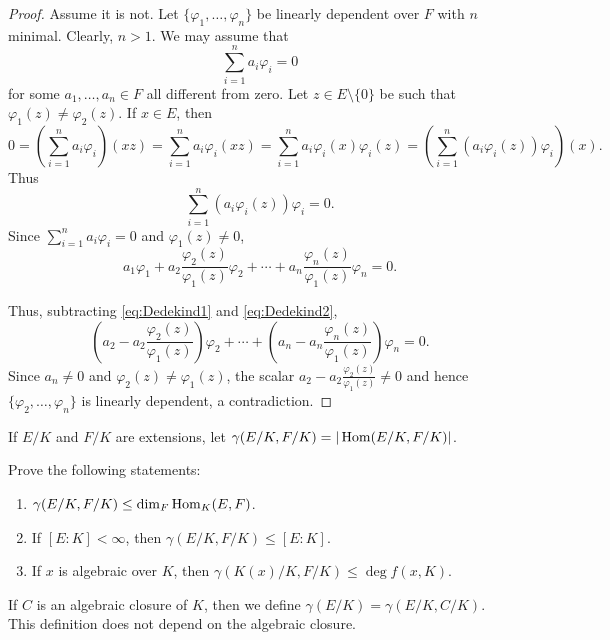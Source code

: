 \begin{proof}
    Assume it is not. Let $\{\varphi_1,\dots,\varphi_n\}$ 
    be linearly dependent over $F$ with $n$ minimal. Clearly, $n>1$. 
    We may assume that 
    \begin{equation}
        \label{eq:Dedekind1}
        \sum_{i=1}^n a_i\varphi_i=0
    \end{equation}
    for some $a_1,\dots,a_n\in F$ all different from zero. 
    Let
    $z\in E\setminus\{0\}$ be such that $\varphi_1(z)\ne\varphi_2(z)$. If $x\in E$, then
    \[
    0=\left(\sum_{i=1}^na_i\varphi_i\right)(xz)=\sum_{i=1}^na_i\varphi_i(xz)
    =\sum_{i=1}^na_i\varphi_i(x)\varphi_i(z)
    =\left(\sum_{i=1}^n (a_i\varphi_i(z))\varphi_i\right)(x).
    \]
    Thus 
    \[
        \sum_{i=1}^n (a_i\varphi_i(z))\varphi_i=0.
    \]
    Since $\sum_{i=1}^na_i\varphi_i=0$ and $\varphi_1(z)\ne0$, 
    \begin{equation}
    \label{eq:Dedekind2}
        a_1\varphi_1+a_2\frac{\varphi_2(z)}{\varphi_1(z)}\varphi_2+\cdots+a_n\frac{\varphi_n(z)}{\varphi_1(z)}\varphi_n=0.
    \end{equation}

    Thus, 
    subtracting \eqref{eq:Dedekind1} and \eqref{eq:Dedekind2}, 
    \[
    \left(a_2-a_2\frac{\varphi_2(z)}{\varphi_1(z)}\right)\varphi_2
    +\cdots+\left(a_n-a_n\frac{\varphi_n(z)}{\varphi_1(z)}\right)\varphi_n=0.
    \]
    Since $a_n\ne 0$ and $\varphi_2(z)\ne\varphi_1(z)$, 
    the scalar $a_2-a_2\frac{\varphi_2(z)}{\varphi_1(z)}\ne 0$ and hence 
    $\{\varphi_2,\dots,\varphi_n\}$ is linearly dependent, a contradiction. 
\end{proof}

If $E/K$ and $F/K$ are extensions, 
let $\gamma(E/K,F/K)=|\operatorname{Hom}(E/K,F/K)|$. 

\begin{exercise}
Prove the following statements:
\begin{enumerate}
    \item $\gamma(E/K,F/K)\leq\dim_F\operatorname{Hom}_K(E,F)$.
    \item If $[E:K]<\infty$, then $\gamma(E/K,F/K)\leq[E:K]$. 
    \item If $x$ is algebraic over $K$, then $\gamma(K(x)/K,F/K)\leq\deg f(x,K)$.
\end{enumerate}
\end{exercise}

If $C$ is an algebraic closure of $K$,
then we define $\gamma(E/K)=\gamma(E/K,C/K)$. This definition does
not depend on the algebraic closure. 

